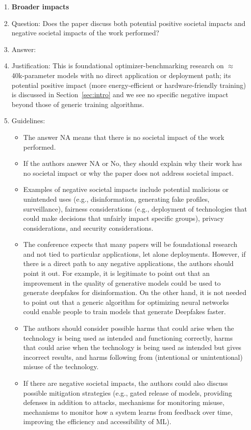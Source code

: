 \documentclass{article}
\begin{document}
\begin{enumerate}
\item {\bf Broader impacts}
    \item[] Question: Does the paper discuss both potential positive societal impacts and negative societal impacts of the work performed?
    \item[] Answer: \answerNA{}
    \item[] Justification: This is foundational optimizer-benchmarking research on $\approx$40k-parameter models with no direct application or deployment path; its potential positive impact (more energy-efficient or hardware-friendly training) is discussed in Section~\ref{sec:intro} and we see no specific negative impact beyond those of generic training algorithms.
    \item[] Guidelines:
    \begin{itemize}
        \item The answer NA means that there is no societal impact of the work performed.
        \item If the authors answer NA or No, they should explain why their work has no societal impact or why the paper does not address societal impact.
        \item Examples of negative societal impacts include potential malicious or unintended uses (e.g., disinformation, generating fake profiles, surveillance), fairness considerations (e.g., deployment of technologies that could make decisions that unfairly impact specific groups), privacy considerations, and security considerations.
        \item The conference expects that many papers will be foundational research and not tied to particular applications, let alone deployments. However, if there is a direct path to any negative applications, the authors should point it out. For example, it is legitimate to point out that an improvement in the quality of generative models could be used to generate deepfakes for disinformation. On the other hand, it is not needed to point out that a generic algorithm for optimizing neural networks could enable people to train models that generate Deepfakes faster.
        \item The authors should consider possible harms that could arise when the technology is being used as intended and functioning correctly, harms that could arise when the technology is being used as intended but gives incorrect results, and harms following from (intentional or unintentional) misuse of the technology.
        \item If there are negative societal impacts, the authors could also discuss possible mitigation strategies (e.g., gated release of models, providing defenses in addition to attacks, mechanisms for monitoring misuse, mechanisms to monitor how a system learns from feedback over time, improving the efficiency and accessibility of ML).
    \end{itemize}


\end{enumerate}
\end{document}
